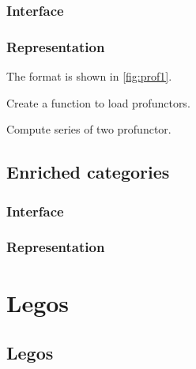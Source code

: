 
\label{sec:exercises-profunctors}

\subsection*{Interface}


\subsection*{Representation}

The format is shown in \cref{fig:prof1}.




\begin{exercise}
  Create a function to load profunctors.

%

\end{exercise}


\begin{exercise}
  Compute series of two profunctor.
%
\end{exercise}


\section{Enriched categories}

\subsection*{Interface}


\subsection*{Representation}


\chapter{Legos}
\label{ch:exercises-legos}


\section{Legos}

